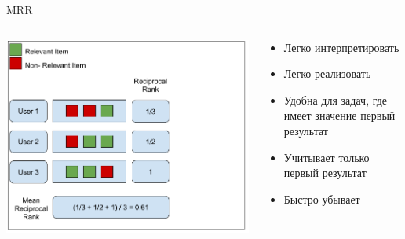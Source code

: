 \documentclass[11pt,aspectratio=169,handout]{beamer}
\begin{document}
\begin{frame}{MRR}

\begin{columns}
\begin{column}{0.5\textwidth}
   \begin{center}
		\includegraphics[scale=0.3]{images/mrr.png}
   \end{center}
\end{column}
\begin{column}{0.4\textwidth}
    \begin{tcolorbox}[colback=info!5,colframe=info!80,title=]
      \begin{itemize}
      \item Легко интерпретировать
      \item Легко реализовать
      \item Удобна для задач, где имеет значение первый результат
      \end{itemize}
    \end{tcolorbox}
    \begin{tcolorbox}[colback=warn!5,colframe=warn!80,title=]
      \begin{itemize}
      \item Учитывает только первый результат
      \item Быстро убывает
      \end{itemize}
    \end{tcolorbox}
\end{column}
\end{columns}

\end{frame}
\end{document}
